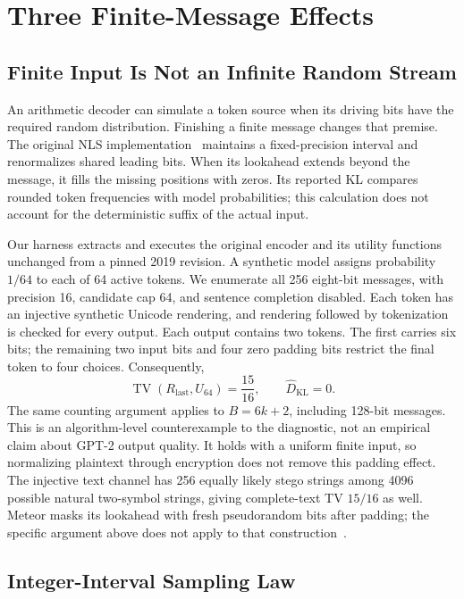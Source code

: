 \section{Three Finite-Message Effects}
\label{sec:audit}

\subsection{Finite Input Is Not an Infinite Random Stream}

An arithmetic decoder can simulate a token source when its driving bits have the
required random distribution. Finishing a finite message changes that premise.
The original NLS implementation~\cite{ziegler2019neural} maintains a fixed-precision
interval and renormalizes shared leading bits. When its lookahead extends beyond
the message, it fills the missing positions with zeros. Its reported KL compares
rounded token frequencies with model probabilities; this calculation does not
account for the deterministic suffix of the actual input.

Our harness extracts and executes the original encoder and its utility functions
unchanged from a pinned 2019 revision. A synthetic model assigns probability
$1/64$ to each of 64 active tokens. We enumerate all 256 eight-bit messages,
with precision 16, candidate cap 64, and sentence completion disabled. Each
token has an injective synthetic Unicode rendering, and rendering followed by
tokenization is checked for every output. Each output contains two tokens.
The first carries six bits; the remaining two input
bits and four zero padding bits restrict the final token to four choices.
Consequently,
\begin{equation}
 \operatorname{TV}(R_{\mathrm{last}},U_{64})=\frac{15}{16},
 \qquad \widehat D_{\mathrm{KL}}=0.
\end{equation}
The same counting argument applies to $B=6k+2$, including 128-bit messages.
This is an algorithm-level counterexample to the diagnostic, not an empirical
claim about GPT-2 output quality. It holds with a uniform finite input, so
normalizing plaintext through encryption does not remove this padding effect.
The injective text channel has 256 equally likely stego strings among 4096
possible natural two-symbol strings, giving complete-text TV $15/16$ as well.
Meteor masks its lookahead with fresh pseudorandom bits after padding; the
specific argument above does not apply to that construction~\cite{kaptchuk2021language}.

\subsection{Integer-Interval Sampling Law}


